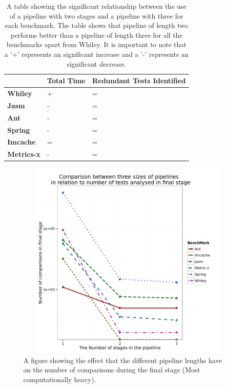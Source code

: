 \begin{table}[h]
\centering
\begin{tabular}{|l|l|l|}
\hline
{\bf }          & {\bf Total Time} & {\bf Redundant Tests Identified} \\ \hline
{\bf Whiley}    & +                & =                           \\ \hline
{\bf Jasm}      & -                & =                           \\ \hline
{\bf Ant}       & -                & =                           \\ \hline
{\bf Spring}    & -                & =                           \\ \hline
{\bf Imcache}   & =                & =                           \\ \hline
{\bf Metrics-x} & -                & =                           \\ \hline
\end{tabular}
\caption{A table showing the significant relationship between the use of a pipeline with two stages and a pipeline with three for each benchmark. The table shows that pipeline of length two performs better than a pipeline of length three for all the benchmarks apart from Whiley. It is important to note that a '+' represents an significant increase and a '-' represents an significant decrease.}
\label{pipelinesig}
\end{table}

\begin{figure}[h]
\begin{center}
\includegraphics[height=10cm, width = 14.5cm]{Pipeline.png}
\end{center}
\caption{A figure showing the effect that the different pipeline lengths have on the number of comparisons during the final stage (Most computationally heavy). }
\label{fig:pipelinegraph}
\end{figure}


